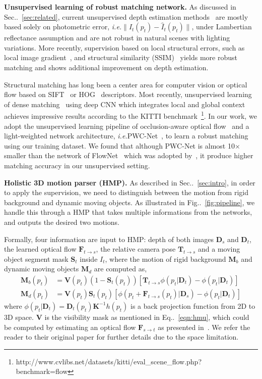 \documentclass[runningheads]{llncs}
\makeatletter
\newcommand{\figref}[1]{Fig\onedot~\ref{#1}}
\newcommand{\equref}[1]{Eq\onedot~\eqref{#1}}
\newcommand{\secref}[1]{Sec\onedot~\ref{#1}}
\newcommand{\ve}[1]{{\mathbf #1}} \newcommand{\hua}[1]{{\mathcal #1}}
\DeclareRobustCommand\onedot{\futurelet\@let@token\@onedot}
\def\onedot{\ifx\@let@token.\else.\null\fi\xspace}
\def\ie{\emph{i.e.}}
\makeatother
\begin{document}
\noindent\textbf{Unsupervised learning of robust matching network.} As discussed in \secref{sec:related}, current unsupervised depth estimation methods~\cite{zhou2017unsupervised,wang2017learning,li2017undeepvo,mahjourian2018unsupervised,yang2018cvpr} are mostly based solely on photometric error, \ie $\|I_t(p_t) - \hat{I}_t(p_t)\|$, under Lambertian reflectance assumption and are not robust in natural scenes with lighting variations. More recently, supervision based on local structural errors, such as local image gradient~\cite{yang2018aaai}, and structural similarity (SSIM)~\cite{wang2004image,godard2016unsupervised,yin2018geonet} yields more robust matching and shows additional improvement on depth estimation. 

Structural matching has long been a center area for computer vision or optical flow based on SIFT~\cite{lowe2004distinctive} or HOG~\cite{lowe1999object} descriptors. Most recently, unsupervised learning of dense matching~\cite{wang2017occlusion} using deep CNN which integrates local and global context achieves impressive results according to the KITTI benchmark~\footnote{http://www.cvlibs.net/datasets/kitti/eval\_scene\_flow.php?benchmark=flow}. 
In our work, we adopt the unsupervised learning pipeline of occlusion-aware optical flow~\cite{wang2017occlusion} and a light-weighted network architecture, \ie PWC-Net~\cite{sun2017pwc}, to learn a robust matching using our training dataset. We found that although PWC-Net is almost 10$\times$ smaller than the network of FlowNet~\cite{IMKDB17} which was adopted by~\cite{wang2017occlusion}, it produce higher matching accuracy in our unsupervised setting. 



\noindent\textbf{Holistic 3D motion parser (HMP).} 
As described in \secref{sec:intro}, in order to apply the supervision, we need to distinguish between the motion from rigid background and 
dynamic moving objects. As illustrated in \figref{fig:pipeline}, we handle this through a HMP that takes multiple informations from the networks, and outputs the desired two motions. 

Formally, four information are input to HMP: depth of both images $\ve{D}_s$ and $\ve{D}_t$, the learned optical flow $\ve{F}_{t\rightarrow s}$, the relative camera pose $\ve{T}_{t\rightarrow s}$ and a moving object segment mask $\ve{S}_t$ inside $I_t$, where the motion of rigid background $\ve{M}_b$ and dynamic moving objects $\ve{M}_d$ are computed as,
\begin{align}
\ve{M}_b(p_t) &= \ve{V}(p_t)(1 - \ve{S}_t(p_t))[\ve{T}_{t\rightarrow s}\phi(p_t|\ve{D}_t) - \phi(p_t|\ve{D}_t)] \nonumber \\
\ve{M}_d(p_t) &= \ve{V}(p_t)\ve{S}_t(p_t)[\phi(p_t+\ve{F}_{t\rightarrow s}(p_t)|\ve{D}_{s}) - \phi(p_t|\ve{D}_t)]
\label{eqn:hmp}
\end{align}
where $\phi(p_t|\ve{D}_t) = \ve{D}_t(p_t)\ve{K}^{-1}h(p_t)$ is a back projection function from 2D to 3D space. $\ve{V}$ is the visibility mask as mentioned in \equref{eqn:hmu}, which could be computed by estimating an optical flow $\ve{F}_{s\rightarrow t}$ as presented in~\cite{wang2017occlusion}. We refer the reader to their original paper for further details due to the space limitation.
\end{document}
